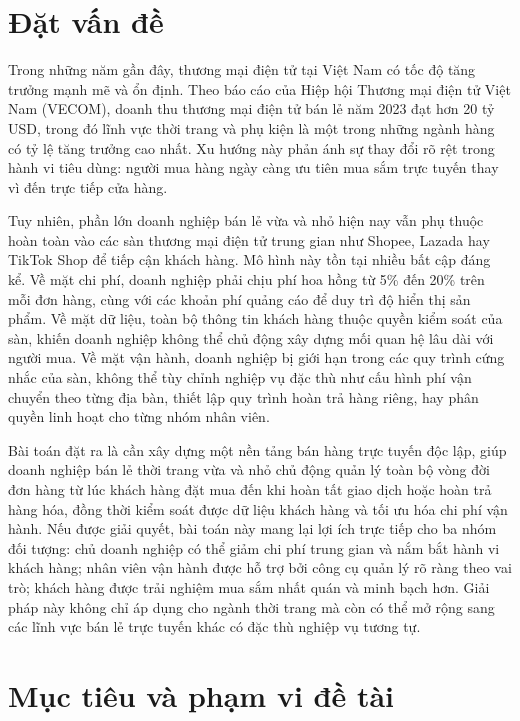 \documentclass[../DoAn.tex]{subfiles}
\begin{document}
\section{Đặt vấn đề}
\label{section:1.1}

  Trong những năm gần đây, thương mại điện tử tại Việt Nam có tốc độ tăng trưởng
  mạnh mẽ và ổn định. Theo báo cáo của Hiệp hội Thương mại điện tử Việt Nam (VECOM),
  doanh thu thương mại điện tử bán lẻ năm 2023 đạt hơn 20 tỷ USD, trong đó lĩnh vực
  thời trang và phụ kiện là một trong những ngành hàng có tỷ lệ tăng trưởng cao nhất.
  Xu hướng này phản ánh sự thay đổi rõ rệt trong hành vi tiêu dùng: người mua hàng
  ngày càng ưu tiên mua sắm trực tuyến thay vì đến trực tiếp cửa hàng.

  Tuy nhiên, phần lớn doanh nghiệp bán lẻ vừa và nhỏ hiện nay vẫn phụ thuộc hoàn
  toàn vào các sàn thương mại điện tử trung gian như Shopee, Lazada hay TikTok Shop
  để tiếp cận khách hàng. Mô hình này tồn tại nhiều bất cập đáng kể. Về mặt chi phí,
  doanh nghiệp phải chịu phí hoa hồng từ 5\% đến 20\% trên mỗi đơn hàng, cùng với
  các khoản phí quảng cáo để duy trì độ hiển thị sản phẩm. Về mặt dữ liệu, toàn bộ
  thông tin khách hàng thuộc quyền kiểm soát của sàn, khiến doanh nghiệp không thể
  chủ động xây dựng mối quan hệ lâu dài với người mua. Về mặt vận hành, doanh nghiệp
  bị giới hạn trong các quy trình cứng nhắc của sàn, không thể tùy chỉnh nghiệp vụ
  đặc thù như cấu hình phí vận chuyển theo từng địa bàn, thiết lập quy trình hoàn trả
  hàng riêng, hay phân quyền linh hoạt cho từng nhóm nhân viên.

  Bài toán đặt ra là cần xây dựng một nền tảng bán hàng trực tuyến độc lập, giúp
  doanh nghiệp bán lẻ thời trang vừa và nhỏ chủ động quản lý toàn bộ vòng đời đơn
  hàng từ lúc khách hàng đặt mua đến khi hoàn tất giao dịch hoặc hoàn trả hàng hóa,
  đồng thời kiểm soát được dữ liệu khách hàng và tối ưu hóa chi phí vận hành. Nếu
  được giải quyết, bài toán này mang lại lợi ích trực tiếp cho ba nhóm đối tượng:
  chủ doanh nghiệp có thể giảm chi phí trung gian và nắm bắt hành vi khách hàng;
  nhân viên vận hành được hỗ trợ bởi công cụ quản lý rõ ràng theo vai trò; khách
  hàng được trải nghiệm mua sắm nhất quán và minh bạch hơn. Giải pháp này không
  chỉ áp dụng cho ngành thời trang mà còn có thể mở rộng sang các lĩnh vực bán lẻ
  trực tuyến khác có đặc thù nghiệp vụ tương tự.

  \section{Mục tiêu và phạm vi đề tài}
  \label{section:1.2}
\end{document}
